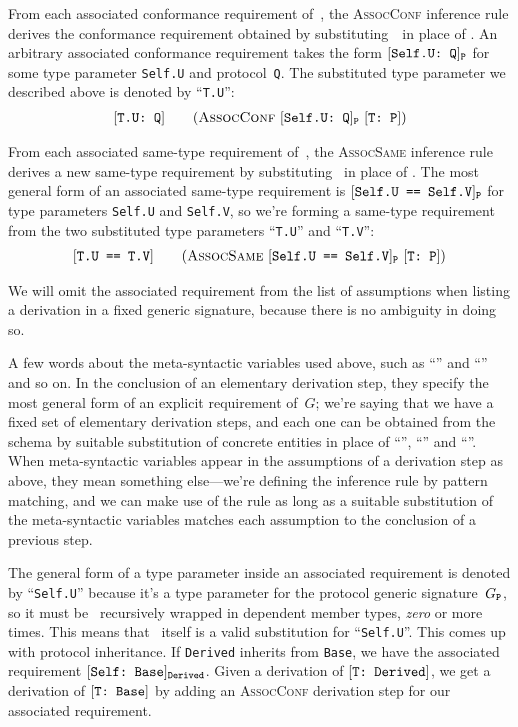 \documentclass[../generics]{subfiles}
\begin{document}
From each associated conformance requirement of~\tP, the \textsc{AssocConf} inference rule derives the conformance requirement obtained by substituting~\tT\ in place of \IndexSelf \tSelf. An arbitrary associated conformance requirement takes the form $[\texttt{Self.U:~Q}]_{\texttt{P}}$ for some type parameter \texttt{Self.U} and protocol~\texttt{Q}. The substituted type parameter we described above is denoted by ``\texttt{T.U}'':
\begin{gather*}
\AssocConfStepDef
\end{gather*}

From each associated same-type requirement of~\tP, the \textsc{AssocSame} inference rule derives a new same-type requirement by substituting \tT\ in place of \tSelf. The most general form of an associated same-type requirement is $[\texttt{Self.U == Self.V}]_{\texttt{P}}$ for type parameters \texttt{Self.U} and \texttt{Self.V}, so we're forming a same-type requirement from the two substituted type parameters ``\texttt{T.U}'' and ``\texttt{T.V}'':
\begin{gather*}
\AssocSameStepDef
\end{gather*}

We will omit the associated requirement from the list of assumptions when listing a derivation in a fixed generic signature, because there is no ambiguity in doing so.

A few words about the meta-syntactic variables used above, such as ``\tT'' and ``\tU'' and so on. In the conclusion of an elementary derivation step, they specify the most general form of an explicit requirement of~$G$; we're saying that we have a fixed set of elementary derivation steps, and each one can be obtained from the schema by suitable substitution of concrete entities in place of ``\tT'', ``\tU'' and ``\tP''. When meta-syntactic variables appear in the assumptions of a derivation step as above, they mean something else---we're defining the inference rule by pattern matching, and we can make use of the rule as long as a suitable substitution of the meta-syntactic variables matches each assumption to the conclusion of a previous step.

The general form of a type parameter inside an associated requirement is denoted by ``\texttt{Self.U}'' because it's a type parameter for the protocol generic signature~$G_{\texttt{P}}$, so it must be \tSelf\ recursively wrapped in dependent member types, \emph{zero} or more times. This means that \tSelf\ itself is a valid substitution for ``\texttt{Self.U}''. This comes up with protocol inheritance. If \texttt{Derived} inherits from \texttt{Base}, we have the associated requirement $[\texttt{Self:~Base}]_{\texttt{Derived}}$. Given a derivation of $[\texttt{T:~Derived}]$, we get a derivation of $[\texttt{T:~Base}]$ by adding an \textsc{AssocConf} derivation step for our associated requirement.
\end{document}
